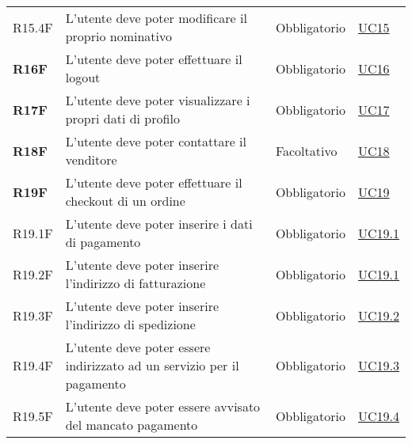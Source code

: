 \begin{center}
\begin{longtable}[!h]{p{50px} p{245px} p{75px} p{50px}}
        R15.4F                                & L'utente deve poter modificare il proprio nominativo                                                       & Obbligatorio             & \hyperref[sec:UC15]{UC15}                    \\
        \textbf{R16F}                         & L'utente deve poter effettuare il logout                                                                   & Obbligatorio             & \hyperref[sec:UC16]{UC16}                    \\
        \textbf{R17F}                         & L'utente deve poter visualizzare i propri dati di profilo                                                  & Obbligatorio             & \hyperref[sec:UC17]{UC17}                    \\
        \textbf{R18F}                         & L'utente deve poter contattare il venditore                                                                & Facoltativo              & \hyperref[sec:UC18]{UC18}                    \\
        \textbf{R19F}                         & L'utente deve poter effettuare il checkout di un ordine                                                    & Obbligatorio             & \hyperref[sec:UC19]{UC19}                    \\
        R19.1F                                & L'utente deve poter inserire i dati di pagamento                                                           & Obbligatorio             & \hyperref[sec:UC19.1]{UC19.1}                \\
        R19.2F                                & L'utente deve poter inserire l'indirizzo di fatturazione                                                   & Obbligatorio             & \hyperref[sec:UC19.1]{UC19.1}                \\
        R19.3F                                & L'utente deve poter inserire l'indirizzo di spedizione                                                     & Obbligatorio             & \hyperref[sec:UC19.2]{UC19.2}                \\
        R19.4F                                & L'utente deve poter essere indirizzato ad un servizio per il pagamento                                     & Obbligatorio             & \hyperref[sec:UC19.3]{UC19.3}                \\
        R19.5F                                & L'utente deve poter essere avvisato del mancato pagamento                                                  & Obbligatorio             & \hyperref[sec:UC19.4]{UC19.4}                \\

\end{longtable}
\end{center}

